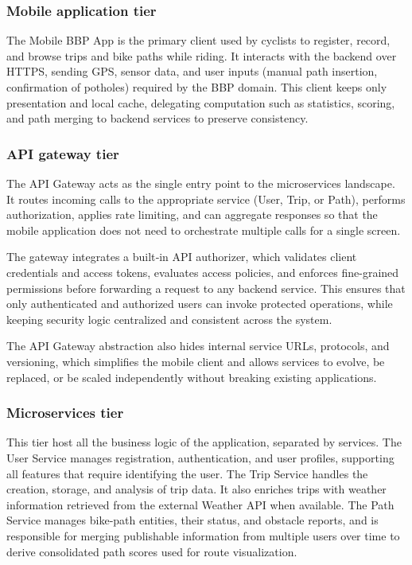 \subsubsection*{Mobile application tier}

The Mobile BBP App is the primary client used by cyclists to register, record, and browse trips and bike paths while riding. It interacts with the backend over HTTPS, sending GPS, sensor data, and user inputs (manual path insertion, confirmation of potholes) required by the BBP domain. This client keeps only presentation and local cache, delegating computation such as statistics, scoring, and path merging to backend services to preserve consistency.

\subsubsection*{API gateway tier}

The API Gateway acts as the single entry point to the microservices landscape. It routes incoming calls to the appropriate service (User, Trip, or Path), performs authorization, applies rate limiting, and can aggregate responses so that the mobile application does not need to orchestrate multiple calls for a single screen. 

The gateway integrates a built‑in API authorizer, which validates client credentials and access tokens, evaluates access policies, and enforces fine-grained permissions before forwarding a request to any backend service. This ensures that only authenticated and authorized users can invoke protected operations, while keeping security logic centralized and consistent across the system. 

The API Gateway abstraction also hides internal service URLs, protocols, and versioning, which simplifies the mobile client and allows services to evolve, be replaced, or be scaled independently without breaking existing applications.


\subsubsection*{Microservices tier}

This tier host all the business logic of the application, separated by services. The User Service manages registration, authentication, and user profiles, supporting all features that require identifying the user. The Trip Service handles the creation, storage, and analysis of trip data. It also enriches trips with weather information retrieved from the external Weather API when available. The Path Service manages bike‑path entities, their status, and obstacle reports, and is responsible for merging publishable information from multiple users over time to derive consolidated path scores used for route visualization.

